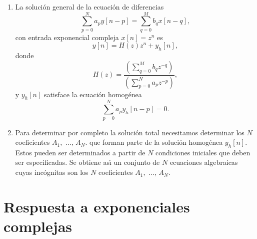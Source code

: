 \begin{enumerate}

\item La soluci\'{o}n general de la ecuaci\'{o}n de diferencias 
\begin{equation}
        \sum_{p=0}^{N}a_{p}y\left[ n-p\right] =\sum_{q=0}^{M}b_{q}x\left[ n-q\right],
\end{equation}
con entrada exponencial compleja $x[n] = z^{n}$ es
\begin{equation}
  y[n] = H(z) z^{n} + y_{h}[n],
\end{equation}
donde
\begin{equation}
     H(z) = \frac{\left( \sum_{q=0}^{M}b_{q}z^{-q}\right) }{\left(\sum_{p=0}^{N}a_{p}z^{-p}\right) },
\end{equation}
y $y_{h}[n]$ satisface la ecuaci\'{o}n homog\'{e}nea
\begin{equation}
        \sum_{p=0}^{N}a_{p}y_{h}\left[ n-p\right] = 0.
\end{equation}

\item Para determinar por completo la soluci\'{o}n total necesitamos determinar los 
$N$ coeficientes $A_{1},$ ..., $A_{N}.$ que forman parte de la soluci\'{o}n homog\'{e}nea $y_{h}[n]$.
Estos pueden ser determinados a partir de $N$ condiciones iniciales que deben ser especificadas. 
Se obtiene as\'{\i} un conjunto de $N$ ecuaciones algebraicas cuyas inc\'{o}gnitas
son los $N$ coeficientes $A_{1},$ ..., $A_{N}$.

\end{enumerate}

\section{Respuesta a exponenciales complejas}

